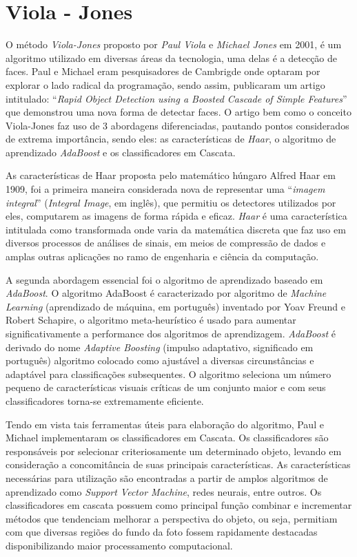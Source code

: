 \documentclass[12pt,a4paper]{article}
\begin{document}
\section{Viola - Jones}
O método \textit{Viola-Jones} proposto por \textit{Paul Viola} e \textit{Michael Jones} em 2001, é um algoritmo utilizado em diversas áreas da tecnologia, uma delas é a detecção de faces. Paul e Michael eram pesquisadores de Cambrigde onde optaram por explorar o lado radical da programação, sendo assim, publicaram um artigo intitulado: “\textit{Rapid Object Detection using a Boosted Cascade of Simple Features}” que demonstrou uma nova forma de detectar faces. O artigo bem como o conceito Viola-Jones faz uso de 3 abordagens diferenciadas, pautando pontos considerados de extrema importância, sendo eles: as características de \textit{Haar}, o algoritmo de aprendizado \textit{AdaBoost} e os classificadores em Cascata.

As características de Haar proposta pelo matemático húngaro Alfred Haar em 1909, foi a primeira maneira considerada nova de representar uma “\textit{imagem integral}” (\textit{Integral Image}, em inglês), que permitiu os detectores utilizados por eles, computarem as imagens de forma rápida e eficaz. \textit{Haar} é uma característica intitulada como transformada onde varia da matemática discreta que faz uso em diversos processos de análises de sinais, em meios de compressão de dados e amplas outras aplicações no ramo de engenharia e ciência da computação.


A segunda abordagem essencial foi o algoritmo de aprendizado baseado em \textit{AdaBoost}. O algoritmo AdaBoost é caracterizado por algoritmo de\textit{ Machine Learning} (aprendizado de máquina, em português) inventado por Yoav Freund e Robert Schapire, o algoritmo meta-heurístico é usado para aumentar significativamente a performance dos algoritmos de aprendizagem. \textit{AdaBoost} é derivado do nome \textit{Adaptive Boosting} (impulso adaptativo, significado em português) algoritmo colocado como ajustável a diversas circunstâncias e adaptável para classificações subsequentes. O algoritmo seleciona um número pequeno de características visuais críticas de um conjunto maior e com seus classificadores torna-se extremamente eficiente.

Tendo em vista tais ferramentas úteis para elaboração do algoritmo, Paul e Michael implementaram os classificadores em Cascata. Os classificadores são responsáveis por selecionar criteriosamente um determinado objeto, levando em consideração a concomitância de suas principais características. As características necessárias para utilização são encontradas a partir de amplos algoritmos de aprendizado como \textit{Support Vector Machine}, redes neurais, entre outros. Os classificadores em cascata possuem como principal função combinar e incrementar métodos que tendenciam melhorar a perspectiva do objeto, ou seja, permitiam com que diversas regiões do fundo da foto fossem rapidamente destacadas disponibilizando maior processamento computacional.
\end{document}
